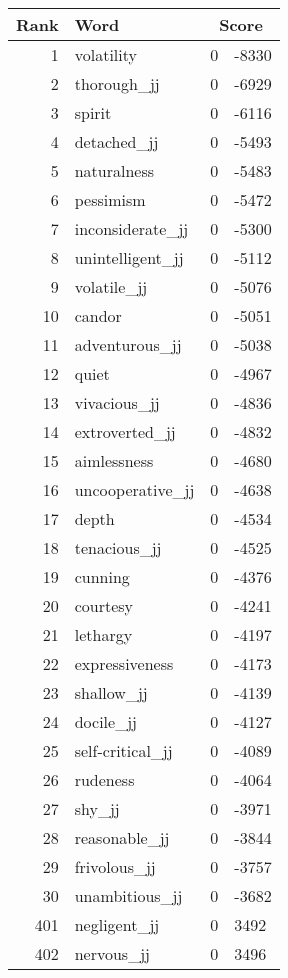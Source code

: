 \begin{longtable}[!htbp]{| rlr@{.}l |}
    \hline
    \textbf{Rank} & \textbf{Word} & \multicolumn{2}{c|}{\textbf{Score}} \\
    \hline
    \endhead
    1 & volatility & 0 & -8330 \\
    2 & thorough\_jj & 0 & -6929 \\
    3 & spirit & 0 & -6116 \\
    4 & detached\_jj & 0 & -5493 \\
    5 & naturalness & 0 & -5483 \\
    6 & pessimism & 0 & -5472 \\
    7 & inconsiderate\_jj & 0 & -5300 \\
    8 & unintelligent\_jj & 0 & -5112 \\
    9 & volatile\_jj & 0 & -5076 \\
    10 & candor & 0 & -5051 \\
    11 & adventurous\_jj & 0 & -5038 \\
    12 & quiet & 0 & -4967 \\
    13 & vivacious\_jj & 0 & -4836 \\
    14 & extroverted\_jj & 0 & -4832 \\
    15 & aimlessness & 0 & -4680 \\
    16 & uncooperative\_jj & 0 & -4638 \\
    17 & depth & 0 & -4534 \\
    18 & tenacious\_jj & 0 & -4525 \\
    19 & cunning & 0 & -4376 \\
    20 & courtesy & 0 & -4241 \\
    21 & lethargy & 0 & -4197 \\
    22 & expressiveness & 0 & -4173 \\
    23 & shallow\_jj & 0 & -4139 \\
    24 & docile\_jj & 0 & -4127 \\
    25 & self-critical\_jj & 0 & -4089 \\
    26 & rudeness & 0 & -4064 \\
    27 & shy\_jj & 0 & -3971 \\
    28 & reasonable\_jj & 0 & -3844 \\
    29 & frivolous\_jj & 0 & -3757 \\
    30 & unambitious\_jj & 0 & -3682 \\
    401 & negligent\_jj & 0 & 3492 \\
    402 & nervous\_jj & 0 & 3496 \\

\end{longtable}
